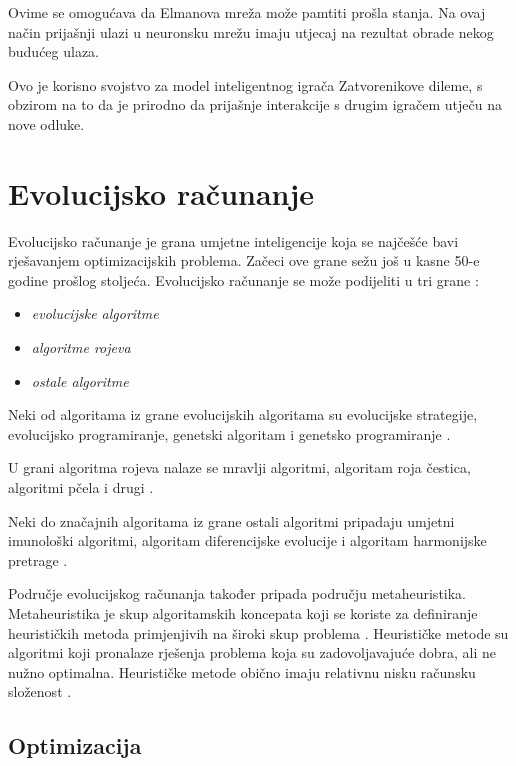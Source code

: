 \documentclass[zavrsnirad]{fer}
\begin{document}
		Ovime se omogućava da Elmanova mreža može pamtiti prošla stanja. Na ovaj način prijašnji ulazi u neuronsku mrežu imaju utjecaj na rezultat obrade nekog budućeg ulaza.
		
		Ovo je korisno svojstvo za model inteligentnog igrača Zatvorenikove dileme, s obzirom na to da je prirodno da prijašnje interakcije s drugim igračem utječu na nove odluke.
	
\chapter{Evolucijsko računanje}
\label{pog:EvolucijskoRacunanje}

	Evolucijsko računanje je grana umjetne inteligencije koja se najčešće bavi rješavanjem optimizacijskih problema. Začeci ove grane sežu još u kasne 50-e godine prošlog stoljeća. Evolucijsko računanje se može podijeliti u tri grane \cite{skriptaEvolucijskoRacunarstvo}: 
	\begin{itemize}
		\item \textit{evolucijske algoritme}
		\item \textit{algoritme rojeva}
		\item \textit{ostale algoritme}
	\end{itemize}
	
	Neki od algoritama iz grane evolucijskih algoritama su evolucijske strategije, evolucijsko programiranje, genetski algoritam i genetsko programiranje \cite{skriptaEvolucijskoRacunarstvo}.
	
	U grani algoritma rojeva nalaze se mravlji algoritmi, algoritam roja čestica, algoritmi pčela i drugi \cite{skriptaEvolucijskoRacunarstvo}.
	
	Neki do značajnih algoritama iz grane ostali algoritmi pripadaju umjetni imunološki algoritmi, algoritam diferencijske evolucije i algoritam harmonijske pretrage \cite{skriptaEvolucijskoRacunarstvo}.
	
	Područje evolucijskog računanja također pripada području metaheuristika. Metaheuristika je skup algoritamskih koncepata koji se koriste za definiranje heurističkih metoda primjenjivih na široki skup problema \cite{skriptaEvolucijskoRacunarstvo}. Heurističke metode su algoritmi koji pronalaze rješenja problema koja su zadovoljavajuće dobra, ali ne nužno optimalna. Heurističke metode obično imaju relativnu nisku računsku složenost \cite{skriptaEvolucijskoRacunarstvo}.

	\section{Optimizacija}
	\label{pog:Optimizacija}
	
\end{document}
